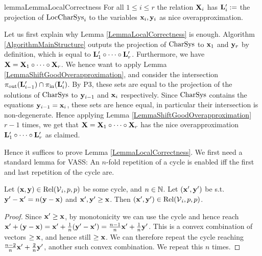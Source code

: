 \begin{restatable}{lemma}{LemmaLocalCorrectness}\label{LemmaLocalCorrectness}
For all \(1 \leq i \leq r\) the relation \(\mathbf{X}_i\) has \(\mathbf{L}_i':=\) the projection of \(\operatorname{LocCharSys}_i\) to the variables \(\mathbf{x}_i, \mathbf{y}_i\) as nice overapproximation.
\end{restatable}

Let us first explain why Lemma \ref{LemmaLocalCorrectness} is enough. Algorithm \ref{AlgorithmMainStructure} outputs the projection of \(\operatorname{CharSys}\) to \(\mathbf{x}_1\) and \(\mathbf{y}_r\) by definition, which is equal to \(\mathbf{L}_1' \circ \dots \circ \mathbf{L}_r'\). Furthermore, we have \(\mathbf{X}=\mathbf{X}_1 \circ \dots \circ \mathbf{X}_r\). We hence want to apply Lemma \ref{LemmaShiftGoodOverapproximation}, and consider the intersection \(\pi_{\text{out}}(\mathbf{L}_{i-1}') \cap \pi_{\text{in}}(\mathbf{L}_{i}')\). By P3, these sets are equal to the projection of the solutions of \(\operatorname{CharSys}\) to \(\mathbf{y}_{i-1}\) and \(\mathbf{x}_i\) respectively. Since \(\operatorname{CharSys}\) contains the equations \(\mathbf{y}_{i-1}=\mathbf{x}_i\), these sets are hence equal, in particular their intersection is non-degenerate. Hence applying Lemma \ref{LemmaShiftGoodOverapproximation} \(r-1\) times, we get that \(\mathbf{X}=\mathbf{X}_1 \circ \dots \circ \mathbf{X}_r\) has the nice overapproximation \(\mathbf{L}_1' \circ \dots \circ \mathbf{L}_r'\) as claimed.

Hence it suffices to prove Lemma \ref{LemmaLocalCorrectness}. We first need a standard lemma for VASS: An \(n\)-fold repetition of a cycle is enabled iff the first and last repetition of the cycle are.

\begin{lemma} \label{LemmaRepeatedCycleExecutable}
Let \((\mathbf{x}, \mathbf{y}) \in \operatorname{Rel}(\operatorname{\mathcal{V}}_i, p,p)\) be some cycle, and \(n \in \mathbb{N}\). Let \((\mathbf{x}', \mathbf{y}')\) be s.t. \(\mathbf{y}'-\mathbf{x}'=n(\mathbf{y}-\mathbf{x})\) and \(\mathbf{x}', \mathbf{y}' \geq \mathbf{x}\). Then \((\mathbf{x}', \mathbf{y}') \in \operatorname{Rel}(\operatorname{\mathcal{V}}_i, p,p)\).
\end{lemma}

\begin{proof}
Since \(\mathbf{x}' \geq \mathbf{x}\), by monotonicity we can use the cycle and hence reach \(\mathbf{x}'+(\mathbf{y}-\mathbf{x})=\mathbf{x}'+\frac{1}{n}(\mathbf{y}'-\mathbf{x}')=\frac{n-1}{n}\mathbf{x}'+\frac{1}{n}\mathbf{y}'\). This is a convex combination of vectors \(\geq \mathbf{x}\), and hence still \(\geq \mathbf{x}\). We can therefore repeat the cycle reaching \(\frac{n-2}{n}\mathbf{x}'+\frac{2}{n}\mathbf{y}'\), another such convex combination. We repeat this \(n\) times.
\end{proof}


